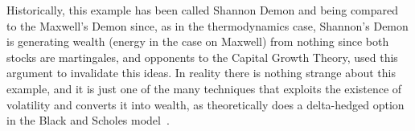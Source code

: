Historically, this example has been called Shannon Demon \cite{poundstone2010fortune} and being compared to the Maxwell's Demon since, as in the thermodynamics case, Shannon's Demon is generating wealth (energy in the case on Maxwell) from nothing since both stocks are martingales, and opponents to the Capital Growth Theory, used this argument to invalidate this ideas. In reality there is nothing strange about this example, and it is just one of the many techniques that exploits the existence of volatility and converts it into wealth, as theoretically does a delta-hedged option in the Black and Scholes model~\cite{black1973pricing}.


